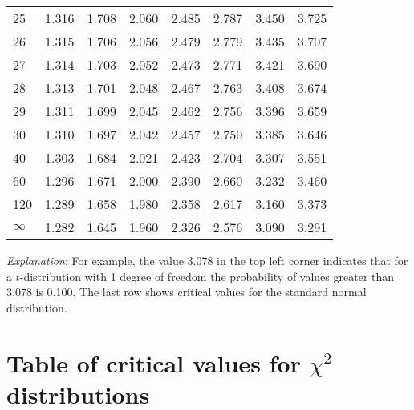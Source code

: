 \begin{center}
\begin{tabular}{|l|rrrrrrr|}
25	&1.316	&1.708	&2.060	&2.485	&2.787&   3.450&  3.725\\
26	&1.315	&1.706	&2.056	&2.479	&2.779&   3.435&  3.707\\
27	&1.314	&1.703	&2.052	&2.473	&2.771&   3.421&  3.690\\
28	&1.313	&1.701	&2.048	&2.467	&2.763&   3.408&  3.674\\
29	&1.311	&1.699	&2.045	&2.462	&2.756&   3.396&  3.659\\
30	&1.310	&1.697	&2.042	&2.457	&2.750&   3.385&  3.646\\
40	&1.303	&1.684	&2.021	&2.423	&2.704&   3.307&  3.551\\
60	&1.296	&1.671	&2.000	&2.390	&2.660&   3.232&  3.460\\
120	&1.289	&1.658	&1.980	&2.358	&2.617&   3.160&  3.373\\
$\infty$
    &1.282	&1.645	&1.960	&2.326	&2.576&   3.090  & 3.291\\
\hline
\end{tabular}
\end{center}
\emph{Explanation}: For example, the value 3.078 in the top left corner
indicates that for a $t$-distribution with 1 degree of freedom the
probability of values greater than 3.078 is 0.100. The last row shows
critical values for the standard normal distribution.

\newpage
\vspace*{5ex}

\section{Table of critical values for $\chi^{2}$ distributions}
\label{s_disttables_chi2}

\vspace*{2ex}

